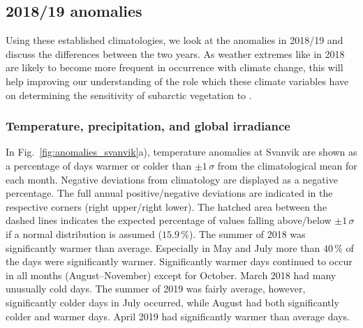 \documentclass[bg, manuscript]{copernicus}
\begin{document}
\subsection{2018/19 anomalies}
\label{subsec:anomalies}
Using these established climatologies, we look at the anomalies in 2018/19 and discuss the differences between the two years. As weather extremes like in 2018 are likely to become more frequent in occurrence with climate change, this will help improving our understanding of the role which these climate variables have on determining the sensitivity of subarctic vegetation to \chem{[O3]}. 

\subsubsection{Temperature, precipitation, and global irradiance}
\label{subsubsec:anomal_tpq}
In Fig.~\ref{fig:anomalies_svanvik}a), temperature anomalies at Svanvik are shown as a percentage of days warmer or colder than $\pm 1\,\sigma$ from the climatological mean for each month. Negative deviations from climatology are displayed as a negative percentage. The full annual positive/negative deviations are indicated in the respective corners (right upper/right lower). The hatched area between the dashed lines indicates the expected percentage of values falling above/below $\pm 1\,\sigma$ if a normal distribution is assumed ($15.9\,\unit{\%}$). The summer of 2018 was significantly warmer than average. Especially in May and July more than $40\,\unit{\%}$ of the days were significantly warmer. Significantly warmer days continued to occur in all months (August--November) except for October. March 2018 had many unusually cold days. The summer of 2019 was fairly average, however, significantly colder days in July occurred, while August had both significantly colder and warmer days. April 2019 had significantly warmer than average days.
\end{document}
